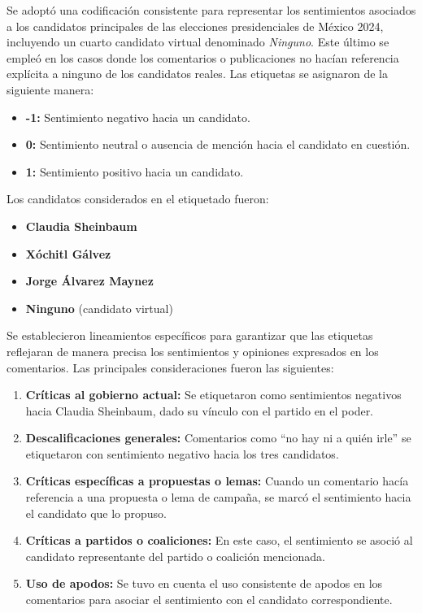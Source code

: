 \documentclass[10pt, a4paper]{article}
\begin{document}
	Se adoptó una codificación consistente para representar los sentimientos asociados a los candidatos principales de las elecciones presidenciales de México 2024, incluyendo un cuarto candidato virtual denominado \textit{Ninguno}. Este último se empleó en los casos donde los comentarios o publicaciones no hacían referencia explícita a ninguno de los candidatos reales. Las etiquetas se asignaron de la siguiente manera:
	
	\begin{itemize}
		\item \textbf{-1:} Sentimiento negativo hacia un candidato.
		\item \textbf{0:} Sentimiento neutral o ausencia de mención hacia el candidato en cuestión.
		\item \textbf{1:} Sentimiento positivo hacia un candidato.
	\end{itemize}
	
	Los candidatos considerados en el etiquetado fueron:
	\begin{itemize}
		\item \textbf{Claudia Sheinbaum}
		\item \textbf{Xóchitl Gálvez}
		\item \textbf{Jorge Álvarez Maynez}
		\item \textbf{Ninguno} (candidato virtual)
	\end{itemize}
	
	
	Se establecieron lineamientos específicos para garantizar que las etiquetas reflejaran de manera precisa los sentimientos y opiniones expresados en los comentarios. Las principales consideraciones fueron las siguientes:
	
	\begin{enumerate}
		\item \textbf{Críticas al gobierno actual:} Se etiquetaron como sentimientos negativos hacia Claudia Sheinbaum, dado su vínculo con el partido en el poder.
		\item \textbf{Descalificaciones generales:} Comentarios como ``no hay ni a quién irle'' se etiquetaron con sentimiento negativo hacia los tres candidatos.
		\item \textbf{Críticas específicas a propuestas o lemas:} Cuando un comentario hacía referencia a una propuesta o lema de campaña, se marcó el sentimiento hacia el candidato que lo propuso.
		\item \textbf{Críticas a partidos o coaliciones:} En este caso, el sentimiento se asoció al candidato representante del partido o coalición mencionada.
		\item \textbf{Uso de apodos:} Se tuvo en cuenta el uso consistente de apodos en los comentarios para asociar el sentimiento con el candidato correspondiente.
	\end{enumerate}
	
\end{document}
